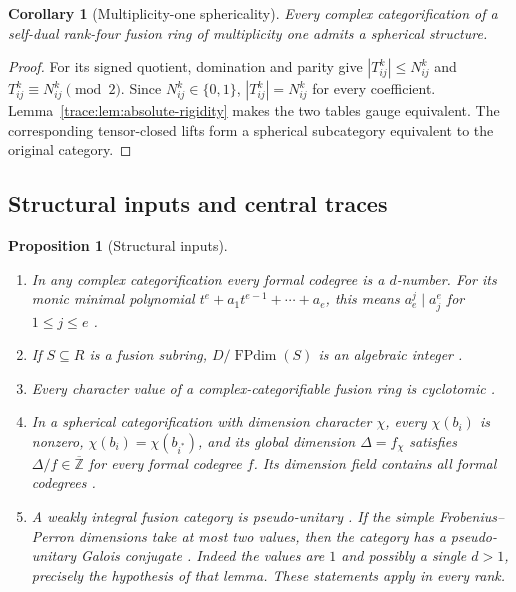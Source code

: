 \documentclass[11pt,a4paper]{article}
\newtheorem{proposition}[theorem]{Proposition}
\newtheorem{corollary}[theorem]{Corollary}
\theoremstyle{definition}\newtheorem{definition}[theorem]{Definition}
\theoremstyle{remark}\newtheorem{remark}[theorem]{Remark}
\DeclareMathOperator{\FPdim}{FPdim}
\newcommand{\ZZ}{\mathbb Z}
\numberwithin{equation}{section}
\begin{document}
\begin{corollary}[Multiplicity-one sphericality]
\label{core:cor:multiplicity-one-spherical}
Every complex categorification of a self-dual rank-four fusion ring
of multiplicity one admits a spherical structure.
\end{corollary}
\begin{proof}
For its signed quotient, domination and parity give
$|T_{ij}^{k}|\le N_{ij}^{k}$ and
$T_{ij}^{k}\equiv N_{ij}^{k}\pmod2$. Since $N_{ij}^{k}\in\{0,1\}$,
$|T_{ij}^{k}|=N_{ij}^{k}$ for every coefficient.
Lemma~\ref{trace:lem:absolute-rigidity} makes the two tables gauge
equivalent. The corresponding tensor-closed lifts form a spherical
subcategory equivalent to the original category.
\end{proof}

\subsection{Structural inputs and central traces}

\begin{proposition}[Structural inputs]\label{finite:prop:standard}
\begin{enumerate}
\item In any complex categorification every formal codegree is a
$d$-number. For its monic minimal polynomial
$t^e+a_1t^{e-1}+\cdots+a_e$, this means
$a_e^j\mid a_j^e$ for $1\leq j\leq e$
\cite{OstrikCodegrees}.
\item If $S\subseteq R$ is a fusion subring, $D/\FPdim(S)$ is an
algebraic integer \cite[Theorem 7.17.6]{EGNO}.
\item Every character value of a complex-categorifiable fusion ring is
cyclotomic \cite[Theorem 8.51 and Corollary 8.53]{ENO}.
\item In a spherical categorification with dimension character $\chi$,
every $\chi(b_i)$ is nonzero, $\chi(b_i)=\chi(b_{i^*})$, and its global
dimension $\Delta=f_\chi$ satisfies $\Delta/f\in\overline{\ZZ}$
for every formal codegree $f$. Its dimension field contains all formal
codegrees \cite[Theorem 2.13 and Corollaries 2.14--2.15]{Ostrik3}.
\item \label{finite:lem:two-dimensions}A weakly integral fusion
category is pseudo-unitary \cite[Proposition~8.24]{ENO}.
If the simple Frobenius--Perron dimensions take at most two values,
then the category has a pseudo-unitary Galois conjugate
\cite[Lemma~3.1]{Schopieray}. Indeed the values are $1$ and
possibly a single $d>1$, precisely the hypothesis of that lemma.
These statements apply in every rank.
\end{enumerate}
\end{proposition}
\end{document}
